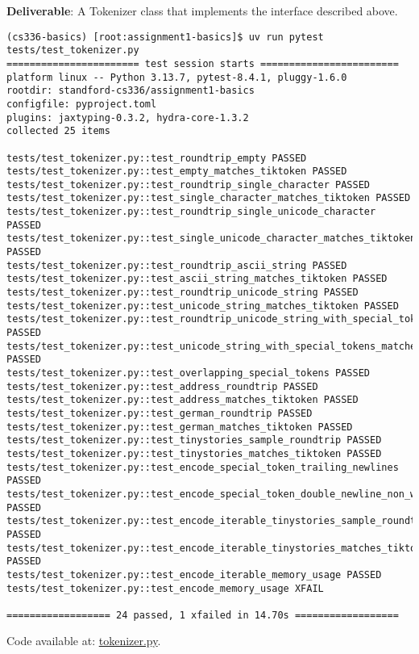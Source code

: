 \textbf{Deliverable}: A Tokenizer class that implements the interface described above.

\begin{lstlisting}
(cs336-basics) [root:assignment1-basics]$ uv run pytest tests/test_tokenizer.py
======================= test session starts ========================
platform linux -- Python 3.13.7, pytest-8.4.1, pluggy-1.6.0
rootdir: standford-cs336/assignment1-basics
configfile: pyproject.toml
plugins: jaxtyping-0.3.2, hydra-core-1.3.2
collected 25 items                                                 

tests/test_tokenizer.py::test_roundtrip_empty PASSED
tests/test_tokenizer.py::test_empty_matches_tiktoken PASSED
tests/test_tokenizer.py::test_roundtrip_single_character PASSED
tests/test_tokenizer.py::test_single_character_matches_tiktoken PASSED
tests/test_tokenizer.py::test_roundtrip_single_unicode_character PASSED
tests/test_tokenizer.py::test_single_unicode_character_matches_tiktoken PASSED
tests/test_tokenizer.py::test_roundtrip_ascii_string PASSED
tests/test_tokenizer.py::test_ascii_string_matches_tiktoken PASSED
tests/test_tokenizer.py::test_roundtrip_unicode_string PASSED
tests/test_tokenizer.py::test_unicode_string_matches_tiktoken PASSED
tests/test_tokenizer.py::test_roundtrip_unicode_string_with_special_tokens PASSED
tests/test_tokenizer.py::test_unicode_string_with_special_tokens_matches_tiktoken PASSED
tests/test_tokenizer.py::test_overlapping_special_tokens PASSED
tests/test_tokenizer.py::test_address_roundtrip PASSED
tests/test_tokenizer.py::test_address_matches_tiktoken PASSED
tests/test_tokenizer.py::test_german_roundtrip PASSED
tests/test_tokenizer.py::test_german_matches_tiktoken PASSED
tests/test_tokenizer.py::test_tinystories_sample_roundtrip PASSED
tests/test_tokenizer.py::test_tinystories_matches_tiktoken PASSED
tests/test_tokenizer.py::test_encode_special_token_trailing_newlines PASSED
tests/test_tokenizer.py::test_encode_special_token_double_newline_non_whitespace PASSED
tests/test_tokenizer.py::test_encode_iterable_tinystories_sample_roundtrip PASSED
tests/test_tokenizer.py::test_encode_iterable_tinystories_matches_tiktoken PASSED
tests/test_tokenizer.py::test_encode_iterable_memory_usage PASSED
tests/test_tokenizer.py::test_encode_memory_usage XFAIL

================== 24 passed, 1 xfailed in 14.70s ==================
\end{lstlisting}

\begin{answer}
Code available at: \href{https://github.com/donglinkang2021/assignment1-basics/blob/main/cs336_basics/tokenizer.py}{tokenizer.py}.
\end{answer}

